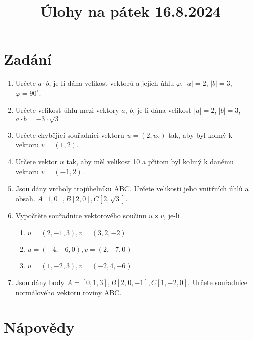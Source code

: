 \documentclass[]{article}
\title{
	{\textbf{Úlohy na pátek 16.8.2024}}
}
\date{}
\begin{document}
	
	\maketitle
	
	\section{Zadání}
	
	\begin{enumerate}
		\item Určete $a \cdot b$, je-li dána velikost vektorů a jejich úhlu $\varphi$. $|a| = 2$, $|b|=3$, $\varphi = 90^\circ$.
		\item Určete velikost úhlu mezi vektory $a$, $b$, je-li dána velikost $|a| = 2$, $|b| = 3$, $a \cdot b = -3\cdot\sqrt{3}$ 
		\item Určete chybějící souřadnici vektoru $u = (2, u_2)$ tak, aby byl kolmý k vektoru $v = (1, 2)$.
		\item Určete vektor $u$ tak, aby měl velikost 10 a přitom byl kolmý k danému vektoru $v = (-1, 2)$.
		\item Jsou dány vrcholy trojúhelníku ABC. Určete velikosti jeho vnitřních úhlů a obsah. $A[1, 0], B[2,0], C[2, \sqrt{3}]$.
		\item Vypočtěte souřadnice vektorového součinu $u \times v$, je-li
		\begin{enumerate}
			\item $u = (2, -1, 3), v = (3, 2, -2)$
			\item $u = (-4, -6, 0), v = (2, -7, 0)$
			\item $u = (1, -2, 3), v = (-2, 4, -6)$
		\end{enumerate}
		\item Jsou dány body $A=[0,1,3], B[2,0,-1], C[1,-2,0]$. Určete souřadnice normálového vektoru roviny ABC.
	\end{enumerate}
	
	\pagebreak
	\section{Nápovědy}
	
\end{document}
